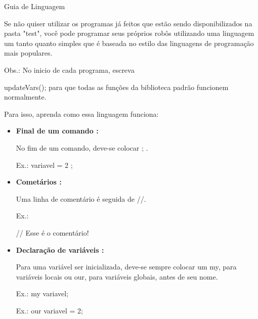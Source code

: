 \documentclass[a4paper]{article}
\begin{document}
{{{{{{{{\textcolor{NavyBlue}{\LARGE Guia de Linguagem}

    \bigskip
    \bigskip
    
    Se não quiser utilizar os programas já feitos
    que estão sendo disponibilizados na pasta "test",
    você pode programar seus próprios robôs utilizando
    uma linguagem um tanto quanto simples que é baseada
    no estilo das linguagens de programação mais 
    populares. 
    
    Obs.: No inicio de cada programa, escreva
    {\textcolor{NavyBlue}{updateVars();} 
    para que todas as funções da biblioteca padrão funcionem 
    normalmente.
    
    Para isso, aprenda como essa linguagem funciona:
    
    \begin{itemize}
        
        \item \textbf{Final de um comando :}
        
            No fim de um comando, deve-se colocar 
            \textcolor{NavyBlue}{;}
            .
        
            \textcolor{NavyBlue}{Ex.:} variavel = 2
            \textcolor{NavyBlue}{;}
        
        \bigskip
        
        \item \textbf{Cometários :}
            
            Uma linha de comentário é seguida de 
            \textcolor{NavyBlue}{//}.
            
            \textcolor{NavyBlue}{Ex.:}
            
            // Esse é o comentário!
       
       \bigskip
       
        \item \textbf{Declaração de variáveis :}
        
            Para uma variável ser inicializada, deve-se
            sempre colocar um 
            \textcolor{NavyBlue}{my},
            para variáveis locais ou 
            \textcolor{NavyBlue}{our},
            para variáveis globais,
            antes de seu nome.
            
            \textcolor{NavyBlue}{Ex.:}
            \textcolor{NavyBlue}{my} 
            variavel;
        
            \textcolor{NavyBlue}{Ex.:} 
            \textcolor{NavyBlue}{our} variavel = 2;  
        

\end{itemize}}}}}}}}}}
\end{document}

